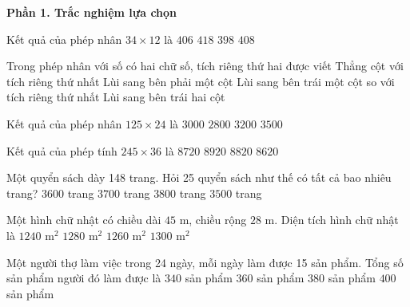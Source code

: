\textbf{Phần 1. Trắc nghiệm lựa chọn}

\begin{ex} %
Kết quả của phép nhân $34 \times 12$ là
\choice
{$406$}
{$418$}
{$398$}
{\True $408$}
\end{ex}

\begin{ex} %
Trong phép nhân với số có hai chữ số, tích riêng thứ hai được viết
\choice
{Thẳng cột với tích riêng thứ nhất}
{Lùi sang bên phải một cột}
{\True Lùi sang bên trái một cột so với tích riêng thứ nhất}
{Lùi sang bên trái hai cột}
\end{ex}

\begin{ex} %
Kết quả của phép nhân $125 \times 24$ là
\choice
{\True $3000$}
{$2800$}
{$3200$}
{$3500$}
\end{ex}

\begin{ex} %
Kết quả của phép tính $245 \times 36$ là
\choice
{$8720$}
{$8920$}
{\True $8820$}
{$8620$}
\end{ex}

\begin{ex} %
Một quyển sách dày 148 trang. Hỏi 25 quyển sách như thế có tất cả bao nhiêu trang?
\choice
{$3600$ trang}
{\True $3700$ trang}
{$3800$ trang}
{$3500$ trang}
\end{ex}

\begin{ex} %
Một hình chữ nhật có chiều dài $45\text{ m}$, chiều rộng $28\text{ m}$. Diện tích hình chữ nhật là
\choice
{$1240\text{ m}^2$}
{$1280\text{ m}^2$}
{\True $1260\text{ m}^2$}
{$1300\text{ m}^2$}
\end{ex}

\begin{ex} %
Một người thợ làm việc trong 24 ngày, mỗi ngày làm được 15 sản phẩm. Tổng số sản phẩm người đó làm được là
\choice
{$340$ sản phẩm}
{\True $360$ sản phẩm}
{$380$ sản phẩm}
{$400$ sản phẩm}
\end{ex}

